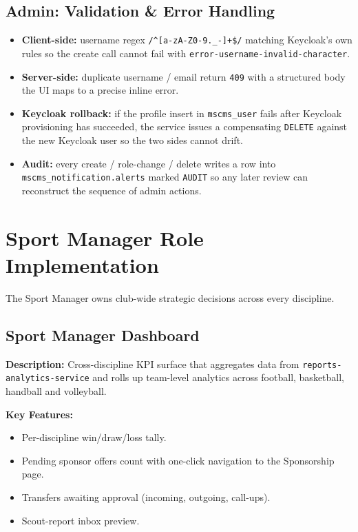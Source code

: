 \documentclass[12pt,a4paper,oneside]{report}
\begin{document}
\subsection*{Admin: Validation \& Error Handling}
\begin{itemize}[leftmargin=*]
  \item \textbf{Client-side:} username regex
        \texttt{/\^{}[a-zA-Z0-9.\_-]+\$/} matching Keycloak's own
        rules so the create call cannot fail with
        \texttt{error-username-invalid-character}.
  \item \textbf{Server-side:} duplicate username / email return
        \texttt{409} with a structured body the UI maps to a
        precise inline error.
  \item \textbf{Keycloak rollback:} if the profile insert in
        \texttt{mscms\_user} fails after Keycloak provisioning has
        succeeded, the service issues a compensating
        \texttt{DELETE} against the new Keycloak user so the two
        sides cannot drift.
  \item \textbf{Audit:} every create / role-change / delete writes a
        row into \texttt{mscms\_notification.alerts} marked
        \texttt{AUDIT} so any later review can reconstruct the
        sequence of admin actions.
\end{itemize}

\section{Sport Manager Role Implementation}
\label{sec:impl-sport-manager}

The Sport Manager owns club-wide strategic decisions across every
discipline.

\subsection*{Sport Manager Dashboard}

\textbf{Description:} Cross-discipline KPI surface that aggregates
data from \texttt{reports-analytics-service} and rolls up team-level
analytics across football, basketball, handball and volleyball.

\textbf{Key Features:}
\begin{itemize}[leftmargin=*]
  \item Per-discipline win/draw/loss tally.
  \item Pending sponsor offers count with one-click navigation to
        the Sponsorship page.
  \item Transfers awaiting approval (incoming, outgoing, call-ups).
  \item Scout-report inbox preview.
\end{itemize}
\end{document}

